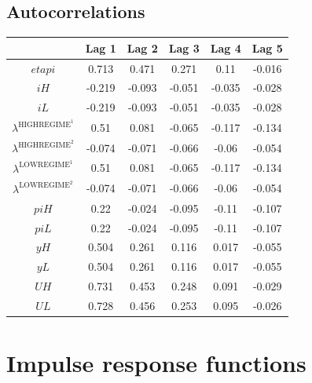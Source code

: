 \subsection{Autocorrelations}

\begin{tabular}{c|ccccc|}
  & Lag 1 & Lag 2 & Lag 3 & Lag 4 & Lag 5\\
\hline
${e\!t\!a\!p\!i}$ & 0.713 & 0.471 & 0.271 & 0.11 & -0.016 \\
${i\!H}$ & -0.219 & -0.093 & -0.051 & -0.035 & -0.028 \\
${i\!L}$ & -0.219 & -0.093 & -0.051 & -0.035 & -0.028 \\
$\lambda^{\mathrm{HIGHREGIME}^{\mathrm{1}}}$ & 0.51 & 0.081 & -0.065 & -0.117 & -0.134 \\
$\lambda^{\mathrm{HIGHREGIME}^{\mathrm{2}}}$ & -0.074 & -0.071 & -0.066 & -0.06 & -0.054 \\
$\lambda^{\mathrm{LOWREGIME}^{\mathrm{1}}}$ & 0.51 & 0.081 & -0.065 & -0.117 & -0.134 \\
$\lambda^{\mathrm{LOWREGIME}^{\mathrm{2}}}$ & -0.074 & -0.071 & -0.066 & -0.06 & -0.054 \\
${p\!i\!H}$ & 0.22 & -0.024 & -0.095 & -0.11 & -0.107 \\
${p\!i\!L}$ & 0.22 & -0.024 & -0.095 & -0.11 & -0.107 \\
${y\!H}$ & 0.504 & 0.261 & 0.116 & 0.017 & -0.055 \\
${y\!L}$ & 0.504 & 0.261 & 0.116 & 0.017 & -0.055 \\
${U\!H}$ & 0.731 & 0.453 & 0.248 & 0.091 & -0.029 \\
${U\!L}$ & 0.728 & 0.456 & 0.253 & 0.095 & -0.026 \\
\hline
\end{tabular}



\pagebreak

\section{Impulse response functions}

